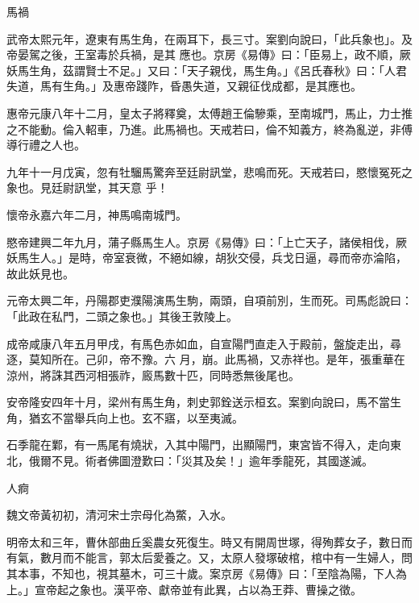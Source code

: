 \begin{pinyinscope}
 馬禍



 武帝太熙元年，遼東有馬生角，在兩耳下，長三寸。案劉向說曰，「此兵象也」。及帝晏駕之後，王室毒於兵禍，是其
 應也。京房《易傳》曰：「臣易上，政不順，厥妖馬生角，茲謂賢士不足。」又曰：「天子親伐，馬生角。」《呂氏春秋》曰：「人君失道，馬有生角。」及惠帝踐阼，昏愚失道，又親征伐成都，是其應也。



 惠帝元康八年十二月，皇太子將釋奠，太傅趙王倫驂乘，至南城門，馬止，力士推之不能動。倫入軺車，乃進。此馬禍也。天戒若曰，倫不知義方，終為亂逆，非傅導行禮之人也。



 九年十一月戊寅，忽有牡騮馬驚奔至廷尉訊堂，悲鳴而死。天戒若曰，愍懷冤死之象也。見廷尉訊堂，其天意
 乎！



 懷帝永嘉六年二月，神馬鳴南城門。



 愍帝建興二年九月，蒲子縣馬生人。京房《易傳》曰：「上亡天子，諸侯相伐，厥妖馬生人。」是時，帝室衰微，不絕如線，胡狄交侵，兵戈日逼，尋而帝亦淪陷，故此妖見也。



 元帝太興二年，丹陽郡吏濮陽演馬生駒，兩頭，自項前別，生而死。司馬彪說曰：「此政在私門，二頭之象也。」其後王敦陵上。



 成帝咸康八年五月甲戌，有馬色赤如血，自宣陽門直走入于殿前，盤旋走出，尋逐，莫知所在。己卯，帝不豫。六
 月，崩。此馬禍，又赤祥也。是年，張重華在涼州，將誅其西河相張祚，廄馬數十匹，同時悉無後尾也。



 安帝隆安四年十月，梁州有馬生角，刺史郭銓送示桓玄。案劉向說曰，馬不當生角，猶玄不當舉兵向上也。玄不寤，以至夷滅。



 石季龍在鄴，有一馬尾有燒狀，入其中陽門，出顯陽門，東宮皆不得入，走向東北，俄爾不見。術者佛圖澄歎曰：「災其及矣！」逾年季龍死，其國遂滅。



 人痾



 魏文帝黃初初，清河宋士宗母化為鱉，入水。



 明帝太和三年，曹休部曲丘奚農女死復生。時又有開周世塚，得殉葬女子，數日而有氣，數月而不能言，郭太后愛養之。又，太原人發塚破棺，棺中有一生婦人，問其本事，不知也，視其墓木，可三十歲。案京房《易傳》曰：「至陰為陽，下人為上。」宣帝起之象也。漢平帝、獻帝並有此異，占以為王莽、曹操之徵。




\end{pinyinscope}
